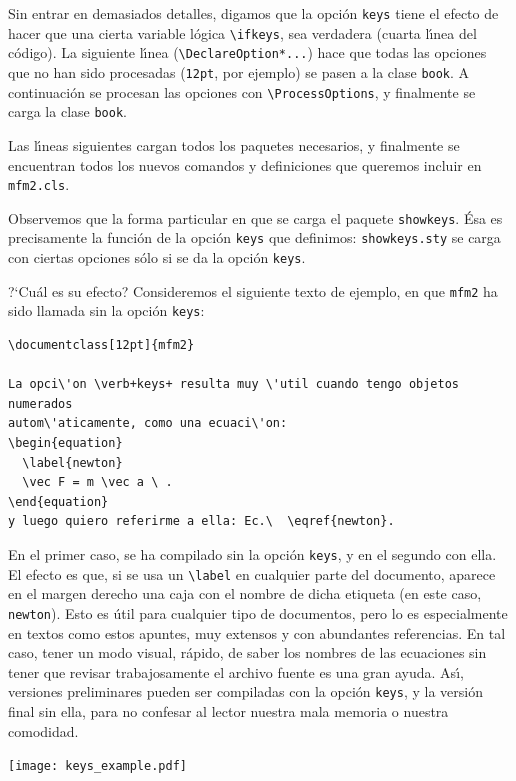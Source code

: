 Sin entrar en demasiados detalles, digamos que la opci\'on \verb+keys+
tiene el efecto de hacer que una cierta variable l\'ogica
\verb+\ifkeys+, sea verdadera (cuarta l\'{\i}nea del c\'odigo). La
siguiente l\'{\i}nea (\verb+\DeclareOption*...+) hace que todas las
opciones que no han sido procesadas (\verb+12pt+, por ejemplo)
se pasen a la clase \verb+book+. A continuaci\'on se procesan las
opciones con \verb+\ProcessOptions+, y finalmente se carga la clase
\verb+book+. 

Las l\'{\i}neas siguientes cargan todos los paquetes necesarios, y
finalmente se encuentran todos los nuevos comandos y definiciones
que queremos incluir en \verb+mfm2.cls+. 

Observemos que la forma particular en que se carga el paquete
\verb+showkeys+. \'Esa es precisamente la funci\'on de la opci\'on
\verb+keys+ que definimos: \verb+showkeys.sty+ se carga con ciertas
opciones s\'olo si se da la opci\'on \verb+keys+. 

?`Cu\'al es su
efecto? Consideremos el siguiente texto de ejemplo, en que \verb+mfm2+
ha sido llamada sin la opci\'on \verb+keys+:
\begin{verbatim}
\documentclass[12pt]{mfm2}              

La opci\'on \verb+keys+ resulta muy \'util cuando tengo objetos numerados
autom\'aticamente, como una ecuaci\'on:
\begin{equation}
  \label{newton}
  \vec F = m \vec a \ . 
\end{equation}
y luego quiero referirme a ella: Ec.\  \eqref{newton}.
\end{verbatim}

En el primer caso, se ha compilado sin la opci\'on \verb+keys+, y en
el segundo con ella. El efecto es que, si se usa un \verb+\label+ en
cualquier parte del documento, aparece en el margen derecho una caja
con el nombre de dicha etiqueta (en este caso, \verb+newton+). 
Esto es \'util para cualquier tipo de
documentos, pero lo es especialmente en textos como
 estos apuntes, muy extensos y con
abundantes referencias. En tal caso, tener un modo visual, r\'apido,
de saber los nombres de las ecuaciones sin tener que revisar
trabajosamente el archivo fuente es una gran ayuda. As\'{\i},
versiones preliminares pueden ser compiladas con la opci\'on
\verb+keys+, y la versi\'on final sin ella, para no confesar al lector
nuestra mala memoria o nuestra comodidad.


\newpage


\ifpdf
 \vspace*{-2.2cm}\hspace*{-4cm}
 \texttt{[image: keys\_example.pdf]}
\fi


